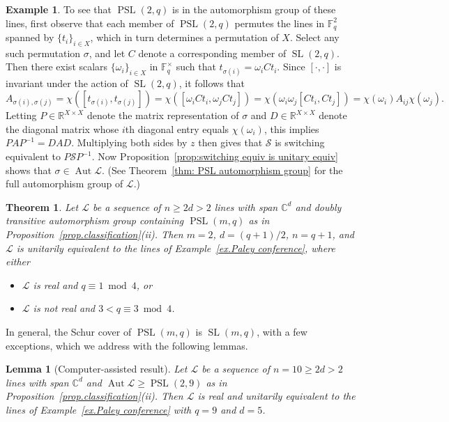 \documentclass[11pt]{article}
\newtheorem{theorem}[theo]{Theorem}
\newtheorem{lemma}[theo]{Lemma}
\theoremstyle{definition}
\newtheorem{example}[theo]{Example}
\numberwithin{equation}{section}
\begin{document}
\begin{example}
To see that $\operatorname{PSL}(2,q)$ is in the automorphism group of these lines, first observe that each member of $\operatorname{PSL}(2,q)$ permutes the lines in $\mathbb{F}_q^2$ spanned by $\{t_i\}_{i\in X}$, which in turn determines a permutation of $X$.
Select any such permutation $\sigma$, and let $C$ denote a corresponding member of $\operatorname{SL}(2,q)$.
Then there exist scalars $\{\omega_i\}_{i\in X}$ in $\mathbb{F}_q^\times$ such that $t_{\sigma(i)}=\omega_iCt_i$.
Since $[\cdot,\cdot]$ is invariant under the action of $\operatorname{SL}(2,q)$, it follows that
\[
A_{\sigma(i),\sigma(j)}
=\chi([t_{\sigma(i)},t_{\sigma(j)}])
=\chi([\omega_iCt_i,\omega_jCt_j])
=\chi(\omega_i\omega_j[Ct_i,Ct_j])
=\chi(\omega_i) A_{ij} \chi(\omega_j).
\]
Letting $P\in\mathbb{R}^{X\times X}$ denote the matrix representation of $\sigma$ and $D\in\mathbb{R}^{X\times X}$ denote the diagonal matrix whose $i$th diagonal entry equals $\chi(\omega_i)$, this implies $PAP^{-1}=DAD$.
Multiplying both sides by $z$ then gives that $\mathcal{S}$ is switching equivalent to $P\mathcal{S}P^{-1}$.
Now Proposition~\ref{prop:switching equiv is unitary equiv} shows that $\sigma\in \operatorname{Aut} \mathscr{L}$.
(See Theorem~\ref{thm: PSL automorphism group} for the full automorphism group of $\mathscr{L}$.)
\end{example}


\begin{theorem}
\label{thm.linear groups}
Let $\mathscr{L}$ be a sequence of $n\geq 2d > 2$ lines with span $\mathbb{C}^d$ and doubly transitive automorphism group containing $\operatorname{PSL}(m,q)$ as in Proposition~\ref{prop.classification}(ii).
Then $m=2$, $d = (q+1)/2$, $n = q+1$, and $\mathscr{L}$ is unitarily equivalent to the lines of Example~\ref{ex.Paley conference}, where either
\begin{itemize}
\item[(a)]
$\mathscr{L}$ is real and $q\equiv1\bmod4$, or
\item[(b)]
$\mathscr{L}$ is not real and $3 < q\equiv3\bmod4$.
\end{itemize}
\end{theorem}

In general, the Schur cover of $\operatorname{PSL}(m,q)$ is $\operatorname{SL}(m,q)$, with a few exceptions, which we address with the following lemmas.

\begin{lemma}[Computer-assisted result]
\label{lem.PSL29}
Let $\mathscr{L}$ be a sequence of $n=10 \geq 2d > 2$ lines with span $\mathbb{C}^d$ and $\operatorname{Aut} \mathscr{L} \geq \operatorname{PSL}(2,9)$ as in Proposition~\ref{prop.classification}(ii).
Then $\mathscr{L}$ is real and unitarily equivalent to the lines of Example~\ref{ex.Paley conference} with $q = 9$ and $d = 5$.
\end{lemma}
\end{document}

